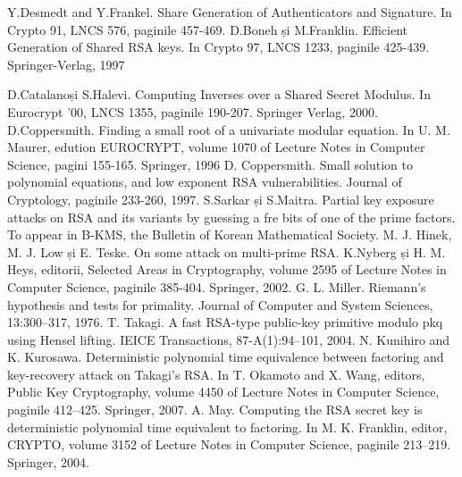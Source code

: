 \documentclass[12pt, oneside]{book}
\begin{document}
\medskip


\begin{thebibliography}{9}
Y.Desmedt and Y.Frankel. Share Generation of Authenticators and Signature. In Crypto 91, LNCS 576, paginile 457-469.
D.Boneh și M.Franklin. Efficient Generation of Shared RSA keys. In Crypto 97, LNCS 1233, paginile 425-439. Springer-Verlag, 1997

D.Catalanoși S.Halevi. Computing Inverses over a Shared Secret Modulus. In Eurocrypt '00, LNCS 1355, paginile 190-207. Springer Verlag, 2000.
D.Coppersmith. Finding a small root of a univariate modular equation. In U. M. Maurer, edution EUROCRYPT, volume 1070 of Lecture Notes in Computer Science, pagini 155-165. Springer, 1996
D. Coppersmith. Small solution to polynomial equations, and low exponent RSA vulnerabilities. Journal of Cryptology, paginile 233-260, 1997.
S.Sarkar și S.Maitra. Partial key exposure attacks on RSA and its variants by guessing a fre bits of one of the prime factors. To appear in B-KMS, the Bulletin of Korean Mathematical Society.
M. J. Hinek, M. J. Low și E. Teske. On some attack on multi-prime RSA. K.Nyberg și H. M. Heys, editorii, Selected Areas in Cryptography, volume 2595 of Lecture Notes in Computer Science, paginile 385-404. Springer, 2002.
G. L. Miller. Riemann’s hypothesis and tests for primality. Journal of Computer and System Sciences, 13:300–317, 1976. 
 T. Takagi. A fast RSA-type public-key primitive modulo pkq using Hensel lifting. IEICE Transactions, 87-A(1):94–101, 2004. 
 N. Kunihiro and K. Kurosawa. Deterministic polynomial time equivalence between factoring and key-recovery attack on Takagi’s RSA. In T. Okamoto and X. Wang, editors, Public Key Cryptography, volume 4450 of Lecture Notes in Computer Science, paginile 412–425. Springer, 2007.
 A. May. Computing the RSA secret key is deterministic polynomial time equivalent to factoring. In M. K. Franklin, editor, CRYPTO, volume 3152 of Lecture Notes in Computer Science, paginile 213–219. Springer, 2004. 
\end{thebibliography}
\end{document}
